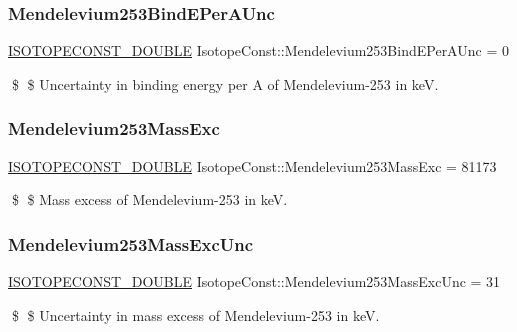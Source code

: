 \subsubsection{\texorpdfstring{Mendelevium253\+Bind\+E\+Per\+A\+Unc}{Mendelevium253BindEPerAUnc}}
{\footnotesize\ttfamily \mbox{\hyperlink{group___isotope_const-_macros_ga8f45a7272ce02c0b4c65c44636ed719a}{I\+S\+O\+T\+O\+P\+E\+C\+O\+N\+S\+T\+\_\+\+D\+O\+U\+B\+LE}} Isotope\+Const\+::\+Mendelevium253\+Bind\+E\+Per\+A\+Unc = 0}

\$ \$ Uncertainty in binding energy per A of Mendelevium-\/253 in keV. \mbox{\label{group___isotope_const-_mendelevium-_md253_ga3b80ed99c9fb742c68b2d0c778c11a41}} 
\subsubsection{\texorpdfstring{Mendelevium253\+Mass\+Exc}{Mendelevium253MassExc}}
{\footnotesize\ttfamily \mbox{\hyperlink{group___isotope_const-_macros_ga8f45a7272ce02c0b4c65c44636ed719a}{I\+S\+O\+T\+O\+P\+E\+C\+O\+N\+S\+T\+\_\+\+D\+O\+U\+B\+LE}} Isotope\+Const\+::\+Mendelevium253\+Mass\+Exc = 81173}

\$ \$ Mass excess of Mendelevium-\/253 in keV. \mbox{\label{group___isotope_const-_mendelevium-_md253_ga2af3f2f5b29bba3a17a2848839a8970a}} 
\subsubsection{\texorpdfstring{Mendelevium253\+Mass\+Exc\+Unc}{Mendelevium253MassExcUnc}}
{\footnotesize\ttfamily \mbox{\hyperlink{group___isotope_const-_macros_ga8f45a7272ce02c0b4c65c44636ed719a}{I\+S\+O\+T\+O\+P\+E\+C\+O\+N\+S\+T\+\_\+\+D\+O\+U\+B\+LE}} Isotope\+Const\+::\+Mendelevium253\+Mass\+Exc\+Unc = 31}

\$ \$ Uncertainty in mass excess of Mendelevium-\/253 in keV. \mbox{\label{group___isotope_const-_mendelevium-_md253_ga85dea61391a3dc9cd6b190e19076dd2c}} 
